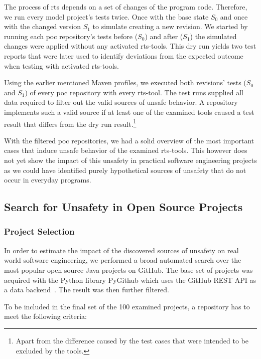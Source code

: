 The process of \ac{rts} depends on a set of changes of the program code. Therefore, we run every model
project's tests
twice. Once with the base state $S_0$ and once with the changed version $S_1$ to
simulate creating a new revision. We started by running each \ac{poc} repository's tests before
($S_0$) and
after ($S_1$) the simulated changes were applied
without any activated \ac{rts}-tools.
This dry run yields two test reports that were later used to identify
deviations from the expected outcome when testing with activated \ac{rts}-tools.

Using the earlier mentioned Maven profiles, we executed both revisions' tests ($S_0$ and
$S_1$) of every \ac{poc} repository with every \ac{rts}-tool. The test runs supplied all
data required to filter out the valid sources of unsafe behavior. A repository implements such a valid source if at
least one of the examined tools caused a test result that differs from the dry run
result.\footnote{Apart from the difference caused by the test cases that were intended to be
    excluded by the tools.}

With the filtered \ac{poc} repositories, we had a solid overview of the most important cases
that induce unsafe behavior of the examined \ac{rts}-tools. This however does not yet show the
impact of this unsafety in practical software engineering projects as we could have identified purely
hypothetical sources of unsafety that do not occur in everyday programs.

\subsection{Search for Unsafety in Open Source Projects}\label{sec:foss_search}

\subsubsection{Project Selection}

In order to estimate the impact of the discovered sources of unsafety on real world software
engineering, we performed a broad automated search over the most popular open source Java projects
on GitHub. The base set of projects was acquired with the Python
library PyGithub which uses the GitHub REST API as a data backend~\cite{pygithub}. The result was then further
filtered.


To be included in the final set of the 100 examined projects, a repository has to meet the following
criteria:

